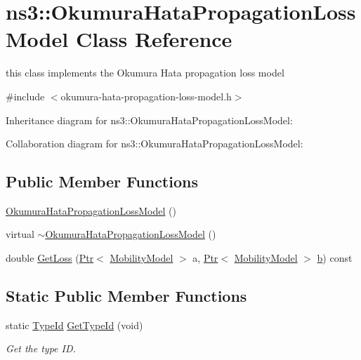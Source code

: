 \hypertarget{classns3_1_1OkumuraHataPropagationLossModel}{}\section{ns3\+:\+:Okumura\+Hata\+Propagation\+Loss\+Model Class Reference}
\label{classns3_1_1OkumuraHataPropagationLossModel}


this class implements the Okumura Hata propagation loss model  




{\ttfamily \#include $<$okumura-\/hata-\/propagation-\/loss-\/model.\+h$>$}



Inheritance diagram for ns3\+:\+:Okumura\+Hata\+Propagation\+Loss\+Model\+:


Collaboration diagram for ns3\+:\+:Okumura\+Hata\+Propagation\+Loss\+Model\+:
\subsection*{Public Member Functions}
\begin{DoxyCompactItemize}
\item 
\hyperlink{classns3_1_1OkumuraHataPropagationLossModel_a85807746cab4ae5198583a046c323d28}{Okumura\+Hata\+Propagation\+Loss\+Model} ()
\item 
virtual \hyperlink{classns3_1_1OkumuraHataPropagationLossModel_a16f73ec1c473d0211f25db66eac9803e}{$\sim$\+Okumura\+Hata\+Propagation\+Loss\+Model} ()
\item 
double \hyperlink{classns3_1_1OkumuraHataPropagationLossModel_aa6ca10bd9ebdbc46deeec2e036ba6938}{Get\+Loss} (\hyperlink{classns3_1_1Ptr}{Ptr}$<$ \hyperlink{classns3_1_1MobilityModel}{Mobility\+Model} $>$ a, \hyperlink{classns3_1_1Ptr}{Ptr}$<$ \hyperlink{classns3_1_1MobilityModel}{Mobility\+Model} $>$ \hyperlink{lte__pathloss_8m_a21ad0bd836b90d08f4cf640b4c298e7c}{b}) const 
\end{DoxyCompactItemize}
\subsection*{Static Public Member Functions}
\begin{DoxyCompactItemize}
\item 
static \hyperlink{classns3_1_1TypeId}{Type\+Id} \hyperlink{classns3_1_1OkumuraHataPropagationLossModel_afaae721cbad0935760b891c29c37681c}{Get\+Type\+Id} (void)
\begin{DoxyCompactList}\small\item\em Get the type ID. \end{DoxyCompactList}\end{DoxyCompactItemize}
